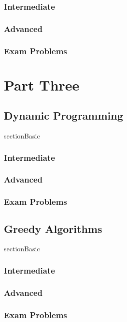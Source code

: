\documentclass[11pt,fleqn]{book}
\begin{document}
\section{Intermediate}
\section{Advanced}
\section{Exam Problems}

\part{Part Three}
\chapter{Dynamic Programming}
section{Basic}
\section{Intermediate}
\section{Advanced}
\section{Exam Problems}
\chapter{Greedy Algorithms}
section{Basic}
\section{Intermediate}
\section{Advanced}
\section{Exam Problems}

\end{document}

